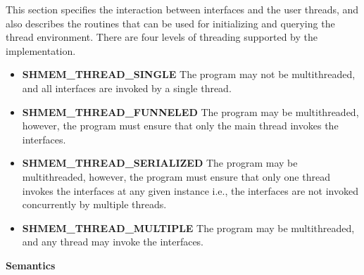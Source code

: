 This section specifies the interaction between \openshmem{} interfaces and the
user threads, and also describes the routines that can be used for initializing and 
querying the thread environment. There are four levels of threading supported by
the \openshmem{} implementation.
 
\begin{itemize}
\item {\bf SHMEM\_THREAD\_SINGLE} The \openshmem{} program may not be multithreaded, 
and all \openshmem{} interfaces are invoked by a single thread. 

\item {\bf SHMEM\_THREAD\_FUNNELED}
The \openshmem{} program may be multithreaded, however, the 
program must ensure that only the main thread invokes the \openshmem{}
interfaces.

\item {\bf SHMEM\_THREAD\_SERIALIZED} 
The \openshmem{} program may be multithreaded, however, the 
program must ensure that only one thread invokes the \openshmem{}
interfaces at any given instance i.e., the \openshmem{} interfaces 
are not invoked concurrently by multiple threads.

\item {\bf SHMEM\_THREAD\_MULTIPLE}
The \openshmem{} program may be multithreaded, and any 
thread may invoke the \openshmem{} interfaces.
\end{itemize}

\hspace{-15pt}
{\bf Semantics}

